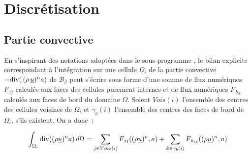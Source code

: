%
% 
%
% 
% 
% 
%
%
\section{Discr\'etisation}
\subsection{\bf Partie convective}
En s'inspirant des notations adopt\'ees dans le sous-programme , le  bilan explicite correspondant \`a l'int\'egration sur une cellule $\Omega_i$
de la partie convective $-{\text{div}(\,(\rho\,\underline{u})^n  a)}$ de $\mathcal{B_{\mathcal{\beta}}}$ 
 peut s'\'ecrire sous forme
d'une somme de flux num\'eriques $F_{\,ij}$ calcul\'es aux faces des
cellules purement internes et de flux num\'eriques $F_{\,b_{ik}}$
calcul\'es aux faces de bord du domaine $\Omega$.
Soient $Vois(i)$ l'ensemble des centres des cellules voisines de ${\Omega_i}$ et
$\gamma_b(i)$ l'ensemble des centres des faces de bord de ${\Omega_i}$, s'ils existent. On a donc~:

\begin{equation}\notag
\int_{\Omega_i}{\text{div}( (\rho \underline{u})^n  a )\, d\Omega} = 
\sum_{j\in Vois(i)}{F_{\,ij}((\rho \underline{u})^n, a)} 
+\sum_{k\in {\gamma_b(i)}} {F_{\,{b}_{ik}}((\rho \underline{u})^n,a)}
\end{equation}

